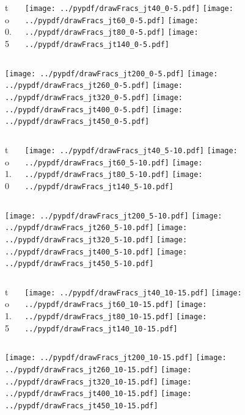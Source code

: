 \documentclass[aspectratio=169]{beamer}
\begin{document}
\begin{figure}[p]
\flushleft
\begin{columns}[T]
\begin{column}{.2\linewidth}
 to 0.5
\end{column}
\begin{column}{.8\linewidth}
\texttt{[image: ../pypdf/drawFracs\_jt40\_0-5.pdf]}
\texttt{[image: ../pypdf/drawFracs\_jt60\_0-5.pdf]}
\texttt{[image: ../pypdf/drawFracs\_jt80\_0-5.pdf]}
\texttt{[image: ../pypdf/drawFracs\_jt140\_0-5.pdf]}
\end{column}
\end{columns}
\texttt{[image: ../pypdf/drawFracs\_jt200\_0-5.pdf]}
\texttt{[image: ../pypdf/drawFracs\_jt260\_0-5.pdf]}
\texttt{[image: ../pypdf/drawFracs\_jt320\_0-5.pdf]}
\texttt{[image: ../pypdf/drawFracs\_jt400\_0-5.pdf]}
\texttt{[image: ../pypdf/drawFracs\_jt450\_0-5.pdf]}
\end{figure}

\begin{figure}[p]
\flushleft
\begin{columns}[T]
\begin{column}{.2\linewidth}
 to 1.0
\end{column}
\begin{column}{.8\linewidth}
\texttt{[image: ../pypdf/drawFracs\_jt40\_5-10.pdf]}
\texttt{[image: ../pypdf/drawFracs\_jt60\_5-10.pdf]}
\texttt{[image: ../pypdf/drawFracs\_jt80\_5-10.pdf]}
\texttt{[image: ../pypdf/drawFracs\_jt140\_5-10.pdf]}
\end{column}
\end{columns}
\texttt{[image: ../pypdf/drawFracs\_jt200\_5-10.pdf]}
\texttt{[image: ../pypdf/drawFracs\_jt260\_5-10.pdf]}
\texttt{[image: ../pypdf/drawFracs\_jt320\_5-10.pdf]}
\texttt{[image: ../pypdf/drawFracs\_jt400\_5-10.pdf]}
\texttt{[image: ../pypdf/drawFracs\_jt450\_5-10.pdf]}
\end{figure}

\begin{figure}[p]
\flushleft
\begin{columns}[T]
\begin{column}{.2\linewidth}
 to 1.5
\end{column}
\begin{column}{.8\linewidth}
\texttt{[image: ../pypdf/drawFracs\_jt40\_10-15.pdf]}
\texttt{[image: ../pypdf/drawFracs\_jt60\_10-15.pdf]}
\texttt{[image: ../pypdf/drawFracs\_jt80\_10-15.pdf]}
\texttt{[image: ../pypdf/drawFracs\_jt140\_10-15.pdf]}
\end{column}
\end{columns}
\texttt{[image: ../pypdf/drawFracs\_jt200\_10-15.pdf]}
\texttt{[image: ../pypdf/drawFracs\_jt260\_10-15.pdf]}
\texttt{[image: ../pypdf/drawFracs\_jt320\_10-15.pdf]}
\texttt{[image: ../pypdf/drawFracs\_jt400\_10-15.pdf]}
\texttt{[image: ../pypdf/drawFracs\_jt450\_10-15.pdf]}
\end{figure}
\end{document}
